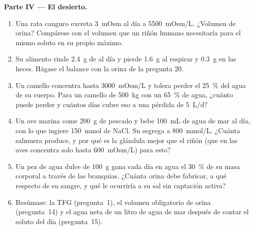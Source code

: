 \begin{problem}
\medskip
\noindent\textbf{Parte IV --- El desierto.}
\begin{enumerate}[resume]
  \item Una rata canguro excreta \qty{3}{mOsm} al día a
        \qty{5500}{mOsm/L}. ¿Volumen de orina? Compárese con el volumen
        que un riñón humano necesitaría para el mismo soluto en su
        propio máximo.
  \item Su alimento rinde \qty{2.4}{g} de  al día y
        pierde \qty{1.6}{g} al respirar y \qty{0.3}{g} en las heces.
        Hágase el balance con la orina de la pregunta 20.
  \item Un camello concentra hasta \qty{3000}{mOsm/L} y tolera perder
        el \qty{25}{\%} del agua de su cuerpo. Para un camello de
        \qty{500}{kg} con un \qty{65}{\%} de agua, ¿cuánto puede perder
        y cuántos días cubre eso a una pérdida de \qty{5}{L/d}?
  \item Un ave marina come \qty{200}{g} de pescado y bebe \qty{100}{mL}
        de agua de mar al día, con lo que ingiere \qty{150}{mmol} de
        NaCl. Su  segrega a \qty{800}{mmol/L}.
        ¿Cuánta salmuera produce, y por qué es la glándula mejor que el
        riñón (que en las aves concentra solo hasta \qty{600}{mOsm/L})
        para esto?
  \item Un pez de agua dulce de \qty{100}{g} gana cada día en agua el
        \qty{30}{\%} de su masa corporal a través de las branquias.
        ¿Cuánta orina debe fabricar, a qué  respecto de su
        sangre, y qué le ocurriría a su sal sin captación activa?
  \item Resúmase: la TFG (pregunta~1), el volumen obligatorio de orina
        (pregunta~14) y el agua neta de un litro de agua de mar después
        de contar el soluto del día (pregunta~15).
\end{enumerate}
\end{problem}
